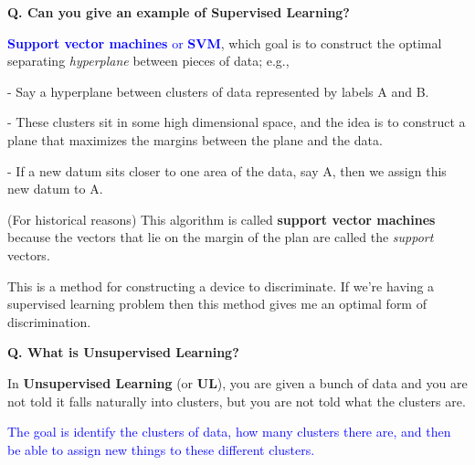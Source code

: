 \begin{frame}[fragile]{\textbf{Q. Can you give an example of Supervised Learning?}}
  \vspace{.4em}
  \begin{wideitemize}
    \item \textcolor{blue}{\textbf{Support vector machines} or \textbf{SVM}}, which
    goal is to construct the optimal separating \textit{hyperplane} between pieces of data; e.g.,
    \begin{wideitemize}
      \item[-] Say a hyperplane between clusters of data represented by labels A and B.
      \item[-] These clusters sit in some high dimensional space, and the idea is to
      construct a plane that maximizes the margins between the plane and the data.
      \item[-] If a new datum sits closer to one area of the data, say A, then
      we assign this new datum to A.
    \end{wideitemize}
    \item (For historical reasons) This algorithm is called \textbf{support
    vector machines} because the vectors that lie on the margin of the plan are
    called the \textit{support} vectors.
  \end{wideitemize}

  \begin{framed}
  This is a method for constructing a device to discriminate. If we're having
  a supervised learning problem then this method gives me an optimal form of
  discrimination.
  \end{framed}

\end{frame}

\begin{frame}[fragile]{\textbf{Q. What is Unsupervised Learning?}}
  \begin{wideitemize}
    \item In \textbf{Unsupervised Learning} (or \textbf{UL}), you are given a
    bunch of data and you are not told it falls naturally into clusters, but
    you are not told what the clusters are.
    \item \textcolor{blue}{The goal is identify the clusters of data, how many clusters there are,
    and then be able to assign new things to these different clusters.}
  \end{wideitemize}
\end{frame}


